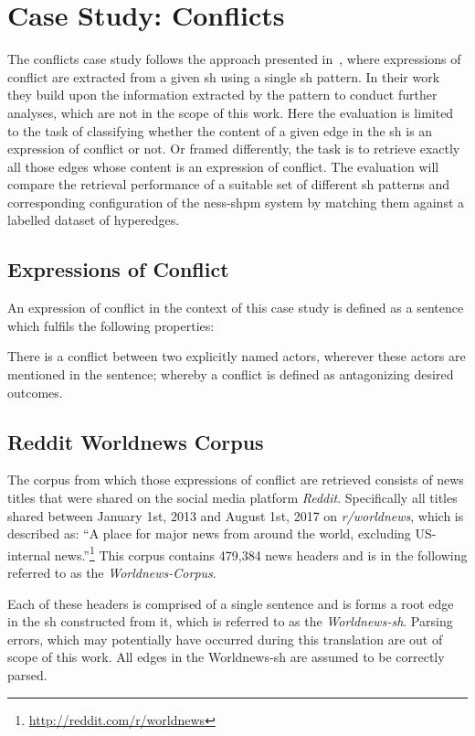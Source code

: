\documentclass[11pt]{scrreprt}
\let\citef\cite  %
\let\cite\parencite  %
\begin{document}
{\section{Case Study: Conflicts}
The conflicts case study follows the approach presented in \citef{menezesSemanticHypergraphs2021}, where expressions of conflict are extracted from a given \gls{sh} using a single \gls{sh} pattern. In their work they build upon the information extracted by the pattern to conduct further analyses, which are not in the scope of this work. Here the evaluation is limited to the task of classifying whether the content of a given edge in the \gls{sh} is an expression of conflict or not. Or framed differently, the task is to retrieve exactly all those edges whose content is an expression of conflict. The evaluation will compare the retrieval performance of a suitable set of different \gls{sh} patterns and corresponding configuration of the \gls{ness-shpm} system by matching them against a labelled dataset of hyperedges.

\subsection{Expressions of Conflict}
\label{sec:conflict-definition}
An expression of conflict in the context of this case study is defined as a sentence which fulfils the following properties:

\begin{displayquote}
There is a conflict between two explicitly named actors, wherever these actors are mentioned in the sentence; whereby a conflict is defined as antagonizing desired outcomes.
\end{displayquote}

\subsection{Reddit Worldnews Corpus}
The corpus from which those expressions of conflict are retrieved consists of news titles that were shared on the social media platform \textit{Reddit}. Specifically all titles shared between January 1st, 2013 and August 1st, 2017 on \textit{r/worldnews}, which is described as: “A place for major news from around the world, excluding US-internal news.”\footnote{\url{http://reddit.com/r/worldnews}} This corpus contains 479,384 news headers and is in the following referred to as the \textit{Worldnews-Corpus}.

Each of these headers is comprised of a single sentence and is forms a root edge in the \gls{sh} constructed from it, which is referred to as the \textit{Worldnews-\gls{sh}}. Parsing errors, which may potentially have occurred during this translation are out of scope of this work. All edges in the Worldnews-\gls{sh} are assumed to be correctly parsed.

}
\end{document}
